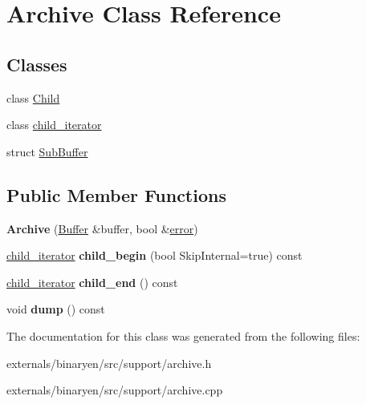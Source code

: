 \hypertarget{class_archive}{}\section{Archive Class Reference}
\label{class_archive}
\subsection*{Classes}
\begin{DoxyCompactItemize}
\item 
class \mbox{\hyperlink{class_archive_1_1_child}{Child}}
\item 
class \mbox{\hyperlink{class_archive_1_1child__iterator}{child\+\_\+iterator}}
\item 
struct \mbox{\hyperlink{struct_archive_1_1_sub_buffer}{Sub\+Buffer}}
\end{DoxyCompactItemize}
\subsection*{Public Member Functions}
\begin{DoxyCompactItemize}
\item 
\mbox{\label{class_archive_aaa5954d72775090fb0ca3c776dc5eed5}} 
{\bfseries Archive} (\mbox{\hyperlink{classstd_1_1vector}{Buffer}} \&buffer, bool \&\mbox{\hyperlink{structerror}{error}})
\item 
\mbox{\label{class_archive_a263337c63ec12543c0e3d81486d6ee17}} 
\mbox{\hyperlink{class_archive_1_1child__iterator}{child\+\_\+iterator}} {\bfseries child\+\_\+begin} (bool Skip\+Internal=true) const
\item 
\mbox{\label{class_archive_a77f42473697d3e7447ff595edc6cf2a4}} 
\mbox{\hyperlink{class_archive_1_1child__iterator}{child\+\_\+iterator}} {\bfseries child\+\_\+end} () const
\item 
\mbox{\label{class_archive_ad399eec14e9dd41230e338c648306d0e}} 
void {\bfseries dump} () const
\end{DoxyCompactItemize}


The documentation for this class was generated from the following files\+:\begin{DoxyCompactItemize}
\item 
externals/binaryen/src/support/archive.\+h\item 
externals/binaryen/src/support/archive.\+cpp\end{DoxyCompactItemize}
